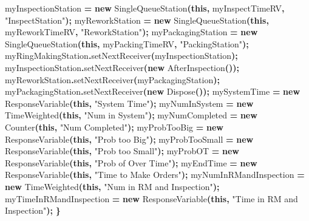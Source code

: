 \documentclass[
]{book}
\newenvironment{Shaded}{\begin{snugshade}}{\end{snugshade}}
\newcommand{\FunctionTok}[1]{\textcolor[rgb]{0.00,0.00,0.00}{#1}}
\newcommand{\KeywordTok}[1]{\textcolor[rgb]{0.13,0.29,0.53}{\textbf{#1}}}
\newcommand{\NormalTok}[1]{#1}
\newcommand{\OperatorTok}[1]{\textcolor[rgb]{0.81,0.36,0.00}{\textbf{#1}}}
\newcommand{\StringTok}[1]{\textcolor[rgb]{0.31,0.60,0.02}{#1}}
\theoremstyle{definition}
\theoremstyle{definition}
\theoremstyle{definition}
\theoremstyle{definition}
\theoremstyle{remark}
\begin{document}
\begin{Shaded}
\begin{Highlighting}[]
\NormalTok{    myInspectionStation }\OperatorTok{=} \KeywordTok{new} \FunctionTok{SingleQueueStation}\OperatorTok{(}\KeywordTok{this}\OperatorTok{,}\NormalTok{ myInspectTimeRV}\OperatorTok{,}
            \StringTok{"InspectStation"}\OperatorTok{);}
\NormalTok{    myReworkStation }\OperatorTok{=} \KeywordTok{new} \FunctionTok{SingleQueueStation}\OperatorTok{(}\KeywordTok{this}\OperatorTok{,}\NormalTok{ myReworkTimeRV}\OperatorTok{,}
            \StringTok{"ReworkStation"}\OperatorTok{);}
\NormalTok{    myPackagingStation }\OperatorTok{=} \KeywordTok{new} \FunctionTok{SingleQueueStation}\OperatorTok{(}\KeywordTok{this}\OperatorTok{,}\NormalTok{ myPackingTimeRV}\OperatorTok{,}
            \StringTok{"PackingStation"}\OperatorTok{);}
\NormalTok{    myRingMakingStation}\OperatorTok{.}\FunctionTok{setNextReceiver}\OperatorTok{(}\NormalTok{myInspectionStation}\OperatorTok{);}
\NormalTok{    myInspectionStation}\OperatorTok{.}\FunctionTok{setNextReceiver}\OperatorTok{(}\KeywordTok{new} \FunctionTok{AfterInspection}\OperatorTok{());}
\NormalTok{    myReworkStation}\OperatorTok{.}\FunctionTok{setNextReceiver}\OperatorTok{(}\NormalTok{myPackagingStation}\OperatorTok{);}
\NormalTok{    myPackagingStation}\OperatorTok{.}\FunctionTok{setNextReceiver}\OperatorTok{(}\KeywordTok{new} \FunctionTok{Dispose}\OperatorTok{());}
\NormalTok{    mySystemTime }\OperatorTok{=} \KeywordTok{new} \FunctionTok{ResponseVariable}\OperatorTok{(}\KeywordTok{this}\OperatorTok{,} \StringTok{"System Time"}\OperatorTok{);}
\NormalTok{    myNumInSystem }\OperatorTok{=} \KeywordTok{new} \FunctionTok{TimeWeighted}\OperatorTok{(}\KeywordTok{this}\OperatorTok{,} \StringTok{"Num in System"}\OperatorTok{);}
\NormalTok{    myNumCompleted }\OperatorTok{=} \KeywordTok{new} \FunctionTok{Counter}\OperatorTok{(}\KeywordTok{this}\OperatorTok{,} \StringTok{"Num Completed"}\OperatorTok{);}
\NormalTok{    myProbTooBig }\OperatorTok{=} \KeywordTok{new} \FunctionTok{ResponseVariable}\OperatorTok{(}\KeywordTok{this}\OperatorTok{,} \StringTok{"Prob too Big"}\OperatorTok{);}
\NormalTok{    myProbTooSmall }\OperatorTok{=} \KeywordTok{new} \FunctionTok{ResponseVariable}\OperatorTok{(}\KeywordTok{this}\OperatorTok{,} \StringTok{"Prob too Small"}\OperatorTok{);}
\NormalTok{    myProbOT }\OperatorTok{=} \KeywordTok{new} \FunctionTok{ResponseVariable}\OperatorTok{(}\KeywordTok{this}\OperatorTok{,} \StringTok{"Prob of Over Time"}\OperatorTok{);}
\NormalTok{    myEndTime }\OperatorTok{=} \KeywordTok{new} \FunctionTok{ResponseVariable}\OperatorTok{(}\KeywordTok{this}\OperatorTok{,} \StringTok{"Time to Make Orders"}\OperatorTok{);}
\NormalTok{    myNumInRMandInspection }\OperatorTok{=} \KeywordTok{new} \FunctionTok{TimeWeighted}\OperatorTok{(}\KeywordTok{this}\OperatorTok{,} \StringTok{"Num in RM and Inspection"}\OperatorTok{);}
\NormalTok{    myTimeInRMandInspection }\OperatorTok{=} \KeywordTok{new} \FunctionTok{ResponseVariable}\OperatorTok{(}\KeywordTok{this}\OperatorTok{,} \StringTok{"Time in RM and Inspection"}\OperatorTok{);}
\OperatorTok{\}}


\end{Highlighting}
\end{Shaded}
\end{document}
